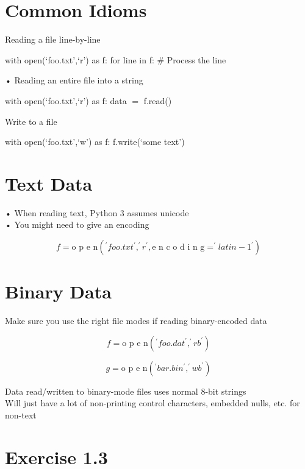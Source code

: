 \documentclass[
  letterpaper,
  DIV=11,
  numbers=noendperiod]{scrreprt}
\begin{document}

\chapter{Common Idioms}\label{common-idioms}

Reading a file line-by-line

with open(`foo.txt',`r') as f: for line in f: \# Process the line

• Reading an entire file into a string

with open(`foo.txt',`r') as f: data \(=\) f.read()

Write to a file

with open(`foo.txt',`w') as f: f.write(`some text\n')


\chapter{Text Data}\label{text-data}

• When reading text, Python 3 assumes unicode\\
• You might need to give an encoding

\[
f = \text {o p e n} \left(^ {\prime} f o o. t x t ^ {\prime}, ^ {\prime} r ^ {\prime}, \text {e n c o d i n g} = ^ {\prime} l a t i n - 1 ^ {\prime}\right)
\]


\chapter{Binary Data}\label{binary-data}

Make sure you use the right file modes if reading binary-encoded data

\[
f = \text {o p e n} \left(^ {\prime} f o o. d a t ^ {\prime}, ^ {\prime} r b ^ {\prime}\right)
\]

\[
g = \text {o p e n} \left(^ {\prime} b a r. b i n ^ {\prime}, ^ {\prime} w b ^ {\prime}\right)
\]

Data read/written to binary-mode files uses normal 8-bit strings\\
Will just have a lot of non-printing control characters, embedded nulls,
etc. for non-text


\chapter{Exercise 1.3}\label{exercise-1.3}
\end{document}
